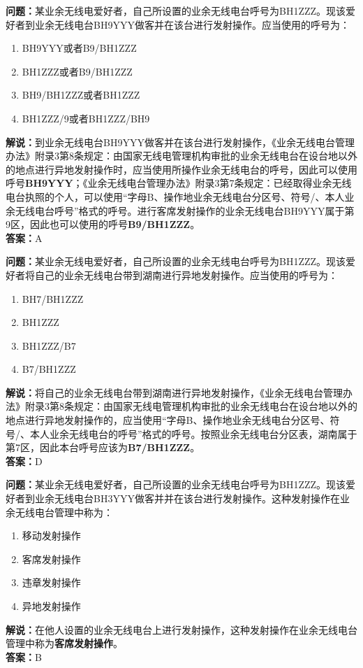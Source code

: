 \bigskip


\noindent\textbf{问题：}某业余无线电爱好者，自己所设置的业余无线电台呼号为BH1ZZZ。现该爱好者到业余无线电台BH9YYY做客并在该台进行发射操作。应当使用的呼号为：
\begin{enumerate}[label=\Alph*), leftmargin=3em]
	\item BH9YYY或者B9/BH1ZZZ
	\item BH1ZZZ或者B9/BH1ZZZ
	\item BH9/BH1ZZZ或者BH1ZZZ
	\item BH1ZZZ/9或者BH1ZZZ/BH9
\end{enumerate}
\noindent\textbf{解说：}到业余无线电台BH9YYY做客并在该台进行发射操作，《业余无线电台管理办法》附录3第8条规定：由国家无线电管理机构审批的业余无线电台在设台地以外的地点进行异地发射操作时，应当使用所操作业余无线电台的呼号，因此可以使用呼号\textbf{BH9YYY}；《业余无线电台管理办法》附录3第7条规定：已经取得业余无线电台执照的个人，可以使用“字母B、操作地业余无线电台分区号、符号/、本人业余无线电台呼号”格式的呼号。进行客席发射操作的业余无线电台BH9YYY属于第9区，因此也可以使用的呼号\textbf{B9/BH1ZZZ}。\\\noindent\textbf{答案：}A


\bigskip


\noindent\textbf{问题：}某业余无线电爱好者，自己所设置的业余无线电台呼号为BH1ZZZ。现该爱好者将自己的业余无线电台带到湖南进行异地发射操作。应当使用的呼号为：
\begin{enumerate}[label=\Alph*), leftmargin=3em]
	\item BH7/BH1ZZZ
	\item BH1ZZZ
	\item BH1ZZZ/B7
	\item B7/BH1ZZZ
\end{enumerate}
\noindent\textbf{解说：}将自己的业余无线电台带到湖南进行异地发射操作，《业余无线电台管理办法》附录3第8条规定：由国家无线电管理机构审批的业余无线电台在设台地以外的地点进行异地发射操作的，应当使用“字母B、操作地业余无线电台分区号、符号/、本人业余无线电台的呼号”格式的呼号。按照业余无线电台分区表，湖南属于第7区，因此本台呼号应该为\textbf{B7/BH1ZZZ}。\\\noindent\textbf{答案：}D



\bigskip


\noindent\textbf{问题：}某业余无线电爱好者，自己所设置的业余无线电台呼号为BH1ZZZ。现该爱好者到业余无线电台BH3YYY做客并并在该台进行发射操作。这种发射操作在业余无线电台管理中称为：
\begin{enumerate}[label=\Alph*), leftmargin=3em]
	\item 移动发射操作
	\item 客席发射操作
	\item 违章发射操作
	\item 异地发射操作
\end{enumerate}
\noindent\textbf{解说：}在他人设置的业余无线电台上进行发射操作，这种发射操作在业余无线电台管理中称为\textbf{客席发射操作}。\\\noindent\textbf{答案：}B


